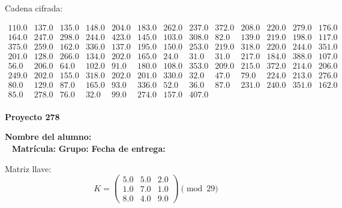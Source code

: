 \documentclass[12pt]{article}
\begin{document}
Cadena cifrada:
\begin{center}
$\begin{array}{lllllllllllll}
110.0 & 137.0 & 135.0 & 148.0 & 204.0 & 183.0 & 262.0 & 237.0 & 372.0 & 208.0 & 220.0 & 279.0 & 176.0\\
164.0 & 247.0 & 298.0 & 244.0 & 423.0 & 145.0 & 103.0 & 308.0 & 82.0 & 139.0 & 219.0 & 198.0 & 117.0\\
375.0 & 259.0 & 162.0 & 336.0 & 137.0 & 195.0 & 150.0 & 253.0 & 219.0 & 318.0 & 220.0 & 244.0 & 351.0\\
201.0 & 128.0 & 266.0 & 134.0 & 202.0 & 165.0 & 24.0 & 31.0 & 31.0 & 217.0 & 184.0 & 388.0 & 107.0\\
56.0 & 206.0 & 64.0 & 102.0 & 91.0 & 180.0 & 108.0 & 353.0 & 209.0 & 215.0 & 372.0 & 214.0 & 206.0\\
249.0 & 202.0 & 155.0 & 318.0 & 202.0 & 201.0 & 330.0 & 32.0 & 47.0 & 79.0 & 224.0 & 213.0 & 276.0\\
80.0 & 129.0 & 87.0 & 165.0 & 93.0 & 336.0 & 52.0 & 36.0 & 87.0 & 231.0 & 240.0 & 351.0 & 162.0\\
85.0 & 278.0 & 76.0 & 32.0 & 99.0 & 274.0 & 157.0 & 407.0\\
\end{array}$
\end{center}

\newpage


\textbf{Proyecto 278}

\textbf{Nombre del alumno:} \underline{\hspace{13cm}}\\\
\vspace{1cm}
\textbf{Matrícula:} \underline{\hspace{4cm}} \hspace{1cm}
\textbf{Grupo:} \underline{\hspace{2cm}}
\textbf{Fecha de entrega:} \underline{\hspace{2cm}}

\medskip

Matriz llave:
\[
K = \begin{pmatrix}
5.0 & 5.0 & 2.0\\
1.0 & 7.0 & 1.0\\
8.0 & 4.0 & 9.0
\end{pmatrix} \pmod{29}
\]
\end{document}
